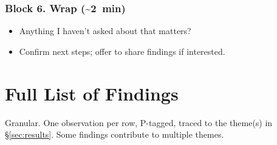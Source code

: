 \documentclass[a4paper,11pt]{article}
\begin{document}
\subsubsection*{Block 6. Wrap (\textasciitilde2~min)}
\begin{itemize}[leftmargin=1.2em,itemsep=2pt]
    \item Anything I haven't asked about that matters?
    \item Confirm next steps; offer to share findings if interested.
\end{itemize}

\newpage
\section{Full List of Findings}\label{app:findings}

Granular. One observation per row, P-tagged, traced to the theme(s)
in \S\ref{sec:results}. Some findings contribute to multiple themes.
\end{document}
